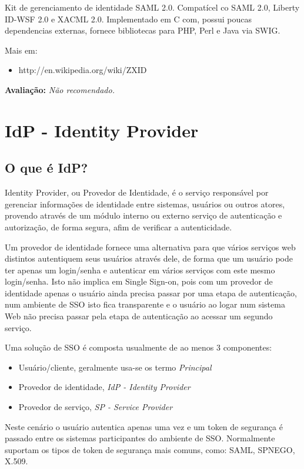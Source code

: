 \documentclass[11pt]{article}
\begin{document}
Kit de gerenciamento de identidade SAML 2.0. Compatícel co SAML 2.0, Liberty
ID-WSF 2.0 e XACML 2.0. Implementado em C com, possui poucas dependencias
externas, fornece bibliotecas para PHP, Perl e Java via SWIG.

Mais em:
\begin{itemize}
  \item{http://en.wikipedia.org/wiki/ZXID}
\end{itemize}

{\bf Avaliação:} {\it Não recomendado.}

\section{IdP - Identity Provider}

\subsection{O que é IdP?}

Identity Provider, ou Provedor de Identidade, é o serviço responsável por
gerenciar informações de identidade entre sistemas, usuários ou outros atores,
provendo através de um módulo interno ou externo serviço de autenticação e
autorização, de forma segura, afim de verificar a autenticidade.

Um provedor de identidade fornece uma alternativa para que vários serviços web
distintos autentiquem seus usuários através dele, de forma que um usuário pode
ter apenas um login/senha e autenticar em vários serviços com este mesmo
login/senha. Isto não implica em Single Sign-on, pois com um provedor de
identidade apenas o usuário ainda precisa passar por uma etapa de
autenticação, num ambiente de SSO isto fica transparente e o usuário ao logar
num sistema Web não precisa passar pela etapa de autenticação ao acessar um
segundo serviço.

Uma solução de SSO é composta usualmente de ao menos 3 componentes:

\begin{itemize}
  \item{Usuário/cliente, geralmente usa-se os termo {\it Principal}}
  \item{Provedor de identidade, {\it IdP - Identity Provider}}
  \item{Provedor de serviço, {\it SP - Service Provider}}
\end{itemize}

Neste cenário o usuário autentica apenas uma vez e um token de segurança é
passado entre os sistemas participantes do ambiente de SSO. Normalmente
suportam os tipos de token de segurança mais comuns, como: SAML, SPNEGO,
X.509.
\end{document}
